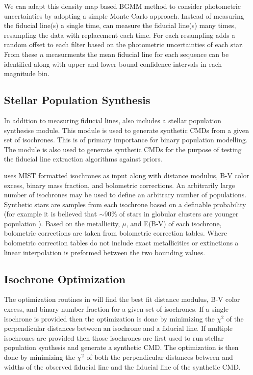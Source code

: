 We can adapt this density map based BGMM method to consider photometric
uncertainties by adopting a simple Monte Carlo approach. Instead of measuring
the fiducial line(s) a single time, \fidanka can measure the fiducial line(s)
many times, resampling the data with replacement each time. For each resampling
\fidanka adds a random offset to each filter based on the photometric
uncertainties of each star. From these $n$ measurments the mean fiducial line
for each sequence can be identified along with upper and lower bound confidence
intervals in each magnitude bin.

\subsection{Stellar Population Synthesis}
In addition to measuring fiducial lines, \fidanka also includes a stellar
population synthesise module. This module is used to generate synthetic CMDs
from a given set of isochrones. This is of primary importance for binary
population modelling. The module is also used to generate synthetic CMDs for
the purpose of testing the fiducial line extraction algorithms against priors.

\fidanka uses MIST formatted isochrones \citep{Dotter2016} as input along
with distance modulus, B-V color excess, binary mass fraction, and bolometric
corrections. An arbitrarily large number of isochrones may be used to define an
arbitrary number of populations. Synthetic stars are samples from each
isochrone based on a definable probability (for example it is believed that
$\sim90\%$ of stars in globular clusters are younger population
\citep[e.g.][]{Suntzeff1996, Carretta2013}). Based on the metallicity, $\mu$, and E(B-V) of each
isochrone, bolometric corrections are taken from bolometric correction tables.
Where bolometric correction tables do not include exact metallicities or
extinctions a linear interpolation is preformed between the two bounding
values. 

\subsection{Isochrone Optimization}
The optimization routines in \fidanka will find the best fit distance modulus,
B-V color excess, and binary number fraction for a given set of isochrones. If
a single isochrone is provided then the optimization is done by minimizing the
$\chi^2$ of the perpendicular distances between an isochrone and a fiducial
line. If multiple isochrones are provided then those isochrones are first used
to run stellar population synthesis and generate a synthetic CMD. The
optimization is then done by minimizing the $\chi^2$ of both the perpendicular
distances between and widths of the observed fiducial line and the fiducial
line of the synthetic CMD.


